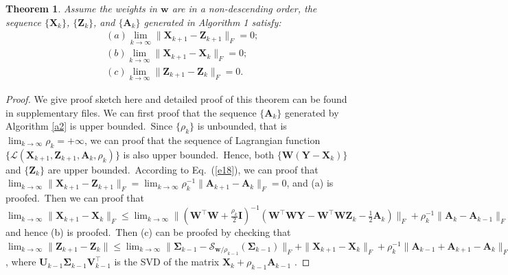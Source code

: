 \documentclass[10pt,twocolumn,letterpaper,sort&compress]{article}
\newtheorem{theorem}{Theorem}
\begin{document}
\begin{theorem}
\label{t1}
Assume the weights in $\bm{w}$ are in a non-descending order, the sequence $\{\mathbf{X}_{k}\}$, $\{\mathbf{Z}_{k}\}$, and $\{\mathbf{A}_{k}\}$ generated in Algorithm 1 satisfy:
\vspace{-3mm}
\begin{align}
&(a) \lim_{k \to \infty} \|\mathbf{X}_{k+1}-\mathbf{Z}_{k+1}\|_{F}=0;
\\
&(b) \lim_{k \to \infty} \|\mathbf{X}_{k+1}-\mathbf{X}_{k}\|_{F}=0;
\\
&(c) \lim_{k \to \infty} \|\mathbf{Z}_{k+1}-\mathbf{Z}_{k}\|_{F}=0.
\end{align}
\vspace{-4mm}
\end{theorem}
\begin{proof}
We give proof sketch here and detailed proof of this theorem can be found in supplementary files. We can first proof that the sequence $\{\mathbf{A}_{k}\}$ generated by Algorithm \ref{a2} is upper bounded.\ Since $\{\rho_{k}\}$ is unbounded, that is $\lim_{k\to\infty}{\rho_{k}}=+\infty$, we can proof that the sequence of Lagrangian function $\{\mathcal{L}(\mathbf{X}_{k+1},\mathbf{Z}_{k+1},\mathbf{A}_{k},\rho_{k})\}$ is also upper bounded.\
Hence, both $\{\mathbf{W}(\mathbf{Y}-\mathbf{X}_{k})\}$ and $\{\mathbf{Z}_{k}\}$ are upper bounded.\ According to Eq.\ (\ref{e18}), we can proof that 
$
\lim_{k \to \infty} 
\|
\mathbf{X}_{k+1}
-
\mathbf{Z}_{k+1}
\|_{F}
=
\lim_{k \to \infty} 
\rho_{k}^{-1}
\|
\mathbf{A}_{k+1}
-
\mathbf{A}_{k}
\|_{F}
=
0
$,
and (a) is proofed.\ Then we can proof that 
$
\lim_{k \to \infty} 
\|
\mathbf{X}_{k+1}
-
\mathbf{X}_{k}
\|_{F}
\le
\lim_{k \to \infty} 
\|
(\mathbf{W}^{\top}\mathbf{W}
+
\frac{\rho_{k}}{2}
\mathbf{I})^{-1}
(\mathbf{W}^{\top}\mathbf{W}\mathbf{Y}
-
\mathbf{W}^{\top}\mathbf{W}\mathbf{Z}_{k}
-
\frac{1}{2}
\mathbf{A}_{k})
\|_{F}
+
\rho_{k}^{-1}\|
\mathbf{A}_{k}-\mathbf{A}_{k-1}
\|_{F}
=
0
$
and hence (b) is proofed.\ Then (c) can be proofed by checking that 
$
\lim_{k \to \infty} \|\mathbf{Z}_{k+1}-\mathbf{Z}_{k}\|
\le
\lim_{k \to \infty} 
\|
\mathbf{\Sigma}_{k-1}-\mathcal{S}_{\bm{w}/\rho_{k-1}}(\mathbf{\Sigma}_{k-1})
\|_{F}
+
\|
\mathbf{X}_{k+1}-\mathbf{X}_{k}
\|_{F}
+
\rho_{k}^{-1}
\|
\mathbf{A}_{k-1}
+
\mathbf{A}_{k+1}
-
\mathbf{A}_{k}
\|_{F}
=
0
$
,
where $\mathbf{U}_{k-1}\mathbf{\Sigma}_{k-1}\mathbf{V}_{k-1}^{\top}$ is the SVD of the matrix $\mathbf{X}_{k}+\rho_{k-1}\mathbf{A}_{k-1}$
.
\end{proof}
\end{document}
